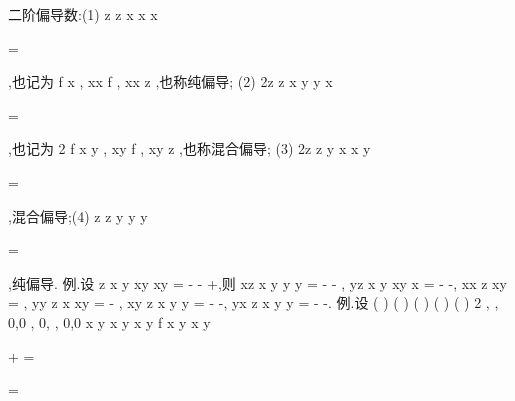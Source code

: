 \textcolor{lyred}{二阶偏导数}:(1)
z
z
x
x
x
\partial 
\partial 
\partial 


=


\partial 
\partial 
\partial 


,也记为
f
x
\partial 
\partial 
,
xx
f ,
xx
z ,也称\textcolor{lyred}{纯偏导}; 
(2)
2z
z
x y
y
x
\partial 
\partial 
\partial 


=


\partial \partial 
\partial 
\partial 


,也记为
2 f
x y
\partial 
\partial \partial ,
xy
f ,
xy
z ,也称\textcolor{lyred}{混合偏导}; 
(3)
2z
z
y x
x
y


\partial 
\partial 
\partial 
=


\partial \partial 
\partial 
\partial 


,混合偏导;(4)
z
z
y
y
y


\partial 
\partial 
\partial 
=


\partial 
\partial 
\partial 


,纯偏导. 
\textcolor{lyred}{例}.设
z
x y
xy
xy
=
-
-
+,则
xz
x y
y
y
=
-
-
,
yz
x y
xy
x
=
-
-, 
xx
z
xy
=
,
yy
z
x
xy
=
-
,
xy
z
x y
y
=
-
-,
yx
z
x y
y
=
-
-. 
\textcolor{lyred}{例}.设
(
)
(
)
(
)
(
)
(
)
2 ,
,
0,0
,
0,
,
0,0
x y
x y
x
y
f x y
x y

\neq 

+
=

=

